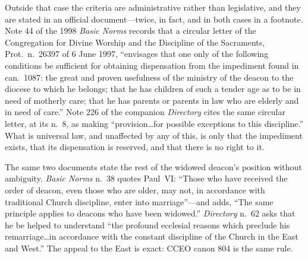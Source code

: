 Outside that case the criteria are administrative rather than legislative, and they are stated in an official document---twice, in fact, and in both cases in a footnote. Note 44 of the 1998 \emph{Basic Norms} records that a circular letter of the Congregation for Divine Worship and the Discipline of the Sacraments, Prot.\ n.~26397 of 6 June 1997, ``envisages that one only of the following conditions be sufficient for obtaining dispensation from the impediment found in can.~1087: the great and proven usefulness of the ministry of the deacon to the diocese to which he belongs; that he has children of such a tender age as to be in need of motherly care; that he has parents or parents in law who are elderly and in need of care.'' Note 226 of the companion \emph{Directory} cites the same circular letter, at its n.~8, as making ``provision\ldots for possible exceptions to this discipline.'' What is universal law, and unaffected by any of this, is only that the impediment exists, that its dispensation is reserved, and that there is no right to it.

The same two documents state the rest of the widowed deacon's position without ambiguity. \emph{Basic Norms} n.~38 quotes Paul~VI: ``Those who have received the order of deacon, even those who are older, may not, in accordance with traditional Church discipline, enter into marriage''---and adds, ``The same principle applies to deacons who have been widowed.'' \emph{Directory} n.~62 asks that he be helped to understand ``the profound ecclesial reasons which preclude his remarriage\ldots in accordance with the constant discipline of the Church in the East and West.'' The appeal to the East is exact: CCEO canon 804 is the same rule.


